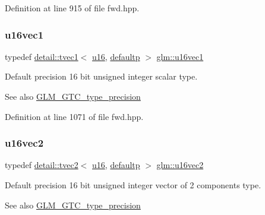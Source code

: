 Definition at line 915 of file fwd.\+hpp.

\mbox{\label{group__gtc__type__precision_ga95324b9d781c51a6d31b05fcc63c5cbe}} 
\subsubsection{\texorpdfstring{u16vec1}{u16vec1}}
{\footnotesize\ttfamily typedef \hyperlink{structglm_1_1detail_1_1tvec1}{detail\+::tvec1}$<$ \hyperlink{group__gtc__type__precision_gae7a1571503f83d2264ddfa705a6b082a}{u16}, \hyperlink{namespaceglm_a0f04f086094c747d227af4425893f545a9d21ccd8b5a009ec7eb7677befc3bf51}{defaultp} $>$ \hyperlink{group__gtc__type__precision_ga95324b9d781c51a6d31b05fcc63c5cbe}{glm\+::u16vec1}}

Default precision 16 bit unsigned integer scalar type. \begin{DoxySeeAlso}{See also}
\hyperlink{group__gtc__type__precision}{G\+L\+M\+\_\+\+G\+T\+C\+\_\+type\+\_\+precision} 
\end{DoxySeeAlso}


Definition at line 1071 of file fwd.\+hpp.

\mbox{\label{group__gtc__type__precision_ga4beac509930099bb494b4bd0a44c49f2}} 
\subsubsection{\texorpdfstring{u16vec2}{u16vec2}}
{\footnotesize\ttfamily typedef \hyperlink{structglm_1_1detail_1_1tvec2}{detail\+::tvec2}$<$ \hyperlink{group__gtc__type__precision_gae7a1571503f83d2264ddfa705a6b082a}{u16}, \hyperlink{namespaceglm_a0f04f086094c747d227af4425893f545a9d21ccd8b5a009ec7eb7677befc3bf51}{defaultp} $>$ \hyperlink{group__gtc__type__precision_ga4beac509930099bb494b4bd0a44c49f2}{glm\+::u16vec2}}

Default precision 16 bit unsigned integer vector of 2 components type. \begin{DoxySeeAlso}{See also}
\hyperlink{group__gtc__type__precision}{G\+L\+M\+\_\+\+G\+T\+C\+\_\+type\+\_\+precision} 
\end{DoxySeeAlso}


